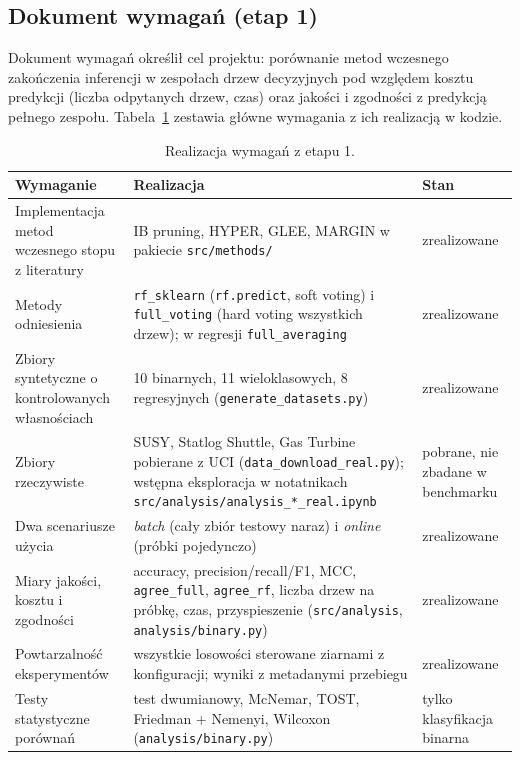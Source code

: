 \documentclass{article}
\newcommand{\code}[1]{\texttt{#1}}
\begin{document}
\subsection{Dokument wymagań (etap 1)}

Dokument wymagań określił cel projektu: porównanie metod wczesnego zakończenia
inferencji w zespołach drzew decyzyjnych pod względem kosztu predykcji (liczba
odpytanych drzew, czas) oraz jakości i zgodności z predykcją pełnego zespołu.
Tabela~\ref{tab:wymagania} zestawia główne wymagania z ich realizacją w kodzie.

\begin{table}[H]
\centering
\footnotesize
\caption{Realizacja wymagań z etapu 1.}
\label{tab:wymagania}
\begin{tabularx}{\textwidth}{@{}>{\raggedright\arraybackslash}p{4.4cm}X>{\centering\arraybackslash}p{1.7cm}@{}}
\toprule
\textbf{Wymaganie} & \textbf{Realizacja} & \textbf{Stan} \\
\midrule
Implementacja metod wczesnego stopu z literatury &
IB pruning, HYPER, GLEE, MARGIN w pakiecie \code{src/methods/} &
zrealizowane \\
Metody odniesienia &
\code{rf\_sklearn} (\code{rf.predict}, soft voting) i \code{full\_voting} (hard voting
wszystkich drzew); w regresji \code{full\_averaging} &
zrealizowane \\
Zbiory syntetyczne o kontrolowanych własnościach &
10 binarnych, 11 wieloklasowych, 8 regresyjnych (\code{generate\_datasets.py}) &
zrealizowane \\
Zbiory rzeczywiste &
SUSY, Statlog Shuttle, Gas Turbine pobierane z UCI (\code{data\_download\_real.py});
wstępna eksploracja w notatnikach \code{src/analysis/analysis\_*\_real.ipynb} &
pobrane, nie zbadane w benchmarku \\
Dwa scenariusze użycia &
\emph{batch} (cały zbiór testowy naraz) i \emph{online} (próbki pojedynczo) &
zrealizowane \\
Miary jakości, kosztu i zgodności &
accuracy, precision/recall/F1, MCC, \code{agree\_full}, \code{agree\_rf}, liczba drzew na
próbkę, czas, przyspieszenie (\code{src/analysis}, \code{analysis/binary.py}) &
zrealizowane \\
Powtarzalność eksperymentów &
wszystkie losowości sterowane ziarnami z konfiguracji; wyniki z metadanymi przebiegu &
zrealizowane \\
Testy statystyczne porównań &
test dwumianowy, McNemar, TOST, Friedman + Nemenyi, Wilcoxon (\code{analysis/binary.py}) &
tylko klasyfikacja binarna \\
\bottomrule
\end{tabularx}
\end{table}
\end{document}
